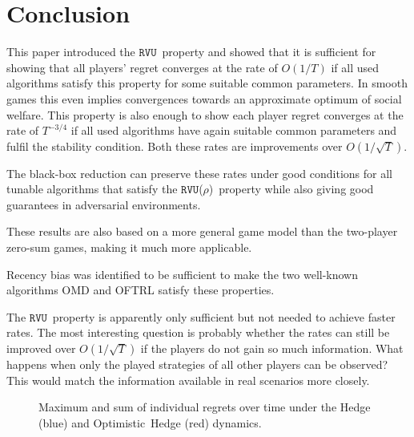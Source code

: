 \documentclass[a4paper]{article}
\theoremstyle{definition}
\newcommand{\myprop}{\ensuremath{\texttt{RVU}}}
\newcommand{\knob}{\ensuremath{\rho}}
\begin{document}
\section{Conclusion}

This paper introduced the \myprop~property and showed that it is
sufficient for showing that all players' regret converges at the rate of
$O(1/T)$ if all used algorithms satisfy this property for some suitable common
parameters.
In smooth games this even implies convergences towards an approximate
optimum of social welfare.
This property is also enough to show each player regret converges at
the rate of $T^{-3/4}$ if all used algorithms have again suitable
common parameters and fulfil the stability condition.
Both these rates are improvements over $O(1/\sqrt{T})$.

The black-box reduction can preserve these rates under good conditions
for all tunable algorithms that satisfy the \myprop(\knob)~property
while also giving good guarantees in adversarial environments.

These results are also based on a more general game model than the
two-player zero-sum games, making it much more applicable.

Recency bias was identified to be sufficient to make the two
well-known algorithms OMD and OFTRL satisfy these properties.

The \myprop~property is apparently only sufficient but not needed to
achieve faster rates.
The most interesting question is probably whether the rates can still
be improved over $O(1/\sqrt{T})$ if the players do not gain so much
information.
What happens when only the played strategies of all other players can
be observed? This would match the information available in real scenarios more closely.


\begin{figure}[htbp]
\centering
{}
\quad
{}
\caption{Maximum and sum of individual regrets over time under the
  Hedge (blue) and \mbox{Optimistic Hedge} (red) dynamics.}\label{fig:regrets}
\end{figure}
\end{document}
